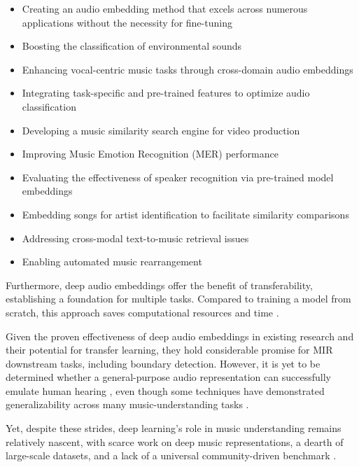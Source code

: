 \begin{itemize}
\item Creating an audio embedding method that excels across numerous applications without the necessity for fine-tuning \cite{Turian2022HEAR:Representations}
\item Boosting the classification of environmental sounds \cite{Kim2020OneStrategies, CramerLOOKEMBEDDINGS}
\item Enhancing vocal-centric music tasks through cross-domain audio embeddings \cite{Kim2021LearningLoss}
\item Integrating task-specific and pre-trained features to optimize audio classification \cite{Hung2022Feature-informedClassification}
\item Developing a music similarity search engine for video production \cite{epidemic}
\item Improving Music Emotion Recognition (MER) performance \cite{KohComparisonRecognition}
\item Evaluating the effectiveness of speaker recognition via pre-trained model embeddings \cite{lightweight}
\item Embedding songs for artist identification to facilitate similarity comparisons \cite{contentmusicsimtriplet2020}
\item Addressing cross-modal text-to-music retrieval issues \cite{WonEmotionStories}
\item Enabling automated music rearrangement \cite{Stoller2018IntuitiveTransitions, Plachouras2023MusicSegmentation}
\end{itemize}

Furthermore, deep audio embeddings offer the benefit of transferability, establishing a foundation for multiple tasks. Compared to training a model from scratch, this approach saves computational resources and time \cite{transferMIR2013, CifkaDeepTransfer}.

Given the proven effectiveness of deep audio embeddings in existing research and their potential for transfer learning, they hold considerable promise for MIR downstream tasks, including boundary detection. However, it is yet to be determined whether a general-purpose audio representation can successfully emulate human hearing \cite{Turian2022HEAR:Representations}, even though some techniques have demonstrated generalizability across many music-understanding tasks \cite{Li2023MERT:Training}.

Yet, despite these strides, deep learning's role in music understanding remains relatively nascent, with scarce work on deep music representations, a dearth of large-scale datasets, and a lack of a universal community-driven benchmark \cite{Yuan2023MARBLE:Evaluation}.